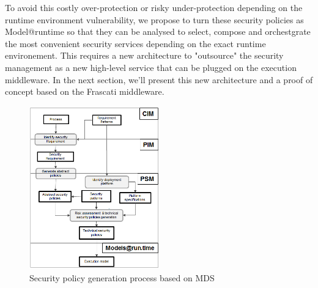 \documentclass[runningheads,a4paper]{llncs}
\begin{document}
To avoid this costly over-protection or risky under-protection depending on the runtime environment vulnerability, we propose to turn these security policies as Model@runtime so that they can be analysed to select, compose and orchestgrate the most convenient security services depending on the exact runtime environement. This requires a new architecture to "outsource" the security management as a new high-level service that can be plugged on the execution middleware. In the next section, we'll present this new architecture and a proof of concept based on the Frascati middleware.







\begin{figure}  
\centering
\includegraphics[height=200pt, width=160pt]{mds.png}
\caption{Security policy generation process based on MDS}
\label{fig:mds}
\end{figure}
\end{document}
